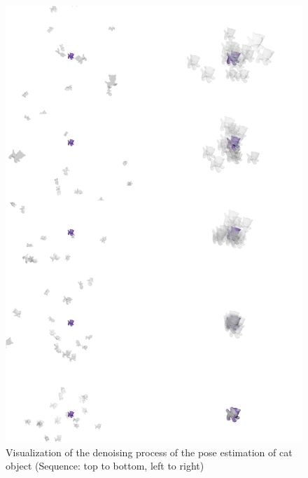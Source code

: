 \documentclass[12pt,DIV14,BCOR12mm,a4paper,footinclude=false,headinclude,parskip=half-,twoside,openright,cleardoublepage=empty,toc=index,bibliography=totoc,listof=totoc]{scrreprt}
\numberwithin{equation}{chapter}
\begin{document}
\begin{figure}[H]
	\centering
	\includegraphics[width=1.\textwidth]{img/vis_cat.pdf}
	\caption{Visualization of the denoising process of the pose estimation of cat object (Sequence: top to bottom, left to right)}
	\label{img:vis_cat}
\end{figure}
\end{document}
